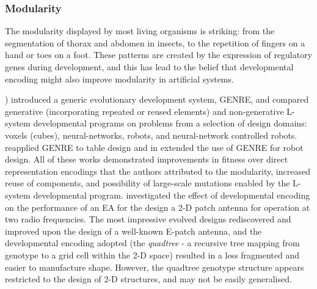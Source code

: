 \subsubsection{Modularity}
The modularity displayed by most living organisms is striking: from the segmentation of thorax and abdomen in insects, to the repetition of fingers on a hand or toes on a foot.  These patterns are created by the expression of regulatory genes during development, and this has lead to the belief that developmental encoding might also improve modularity in artificial systems. 

\cite{Hornby:2003jt}) introduced a generic evolutionary development system, GENRE, and compared generative (incorporating repeated or reused elements) and non-generative L-system developmental programs on problems from a selection of design domains: voxels (cubes), neural-networks, robots, and neural-network controlled robots.  \cite{Hornby:2005rw} reapplied GENRE to table design and in \cite{Hornby:2006kj} extended the use of GENRE for robot design. All of these works demonstrated improvements in fitness over direct representation encodings that the authors attributed to the modularity, increased reuse of components, and possibility of large-scale mutations enabled by the L-system developmental program. \cite{Dorica:2007li} investigated the effect of developmental encoding on the performance of an EA for the design a 2-D patch antenna for operation at two radio frequencies. The most impressive evolved designs rediscovered and improved upon the design of a well-known E-patch antenna, and the developmental encoding adopted (the \emph{quadtree} - a recursive tree mapping from genotype to a grid cell within the 2-D space) resulted in a less fragmented and easier to manufacture shape. However, the quadtree genotype structure appears restricted to the design of 2-D structures, and may not be easily generalised.
